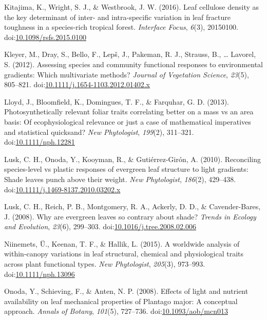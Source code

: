 \documentclass[12pt,]{article}
\theoremstyle{definition}
\theoremstyle{definition}
\theoremstyle{definition}
\theoremstyle{remark}
\begin{document}
\leavevmode\hypertarget{ref-Kitajima2016}{}%
Kitajima, K., Wright, S. J., \& Westbrook, J. W. (2016). Leaf cellulose
density as the key determinant of inter- and intra-specific variation in
leaf fracture toughness in a species-rich tropical forest.
\emph{Interface Focus}, \emph{6}(3), 20150100.
doi:\href{https://doi.org/10.1098/rsfs.2015.0100}{10.1098/rsfs.2015.0100}

\leavevmode\hypertarget{ref-Kleyer2012}{}%
Kleyer, M., Dray, S., Bello, F., Lepš, J., Pakeman, R. J., Strauss, B.,
\ldots{} Lavorel, S. (2012). Assessing species and community functional
responses to environmental gradients: Which multivariate methods?
\emph{Journal of Vegetation Science}, \emph{23}(5), 805--821.
doi:\href{https://doi.org/10.1111/j.1654-1103.2012.01402.x}{10.1111/j.1654-1103.2012.01402.x}

\leavevmode\hypertarget{ref-Lloyd2013}{}%
Lloyd, J., Bloomfield, K., Domingues, T. F., \& Farquhar, G. D. (2013).
Photosynthetically relevant foliar traits correlating better on a mass
vs an area basis: Of ecophysiological relevance or just a case of
mathematical imperatives and statistical quicksand? \emph{New
Phytologist}, \emph{199}(2), 311--321.
doi:\href{https://doi.org/10.1111/nph.12281}{10.1111/nph.12281}

\leavevmode\hypertarget{ref-Lusk2010}{}%
Lusk, C. H., Onoda, Y., Kooyman, R., \& Gutiérrez-Girón, A. (2010).
Reconciling species-level vs plastic responses of evergreen leaf
structure to light gradients: Shade leaves punch above their weight.
\emph{New Phytologist}, \emph{186}(2), 429--438.
doi:\href{https://doi.org/10.1111/j.1469-8137.2010.03202.x}{10.1111/j.1469-8137.2010.03202.x}

\leavevmode\hypertarget{ref-Lusk2008}{}%
Lusk, C. H., Reich, P. B., Montgomery, R. A., Ackerly, D. D., \&
Cavender-Bares, J. (2008). Why are evergreen leaves so contrary about
shade? \emph{Trends in Ecology and Evolution}, \emph{23}(6), 299--303.
doi:\href{https://doi.org/10.1016/j.tree.2008.02.006}{10.1016/j.tree.2008.02.006}

\leavevmode\hypertarget{ref-Niinemets2015}{}%
Niinemets, Ü., Keenan, T. F., \& Hallik, L. (2015). A worldwide analysis
of within-canopy variations in leaf structural, chemical and
physiological traits across plant functional types. \emph{New
Phytologist}, \emph{205}(3), 973--993.
doi:\href{https://doi.org/10.1111/nph.13096}{10.1111/nph.13096}

\leavevmode\hypertarget{ref-Onoda2008}{}%
Onoda, Y., Schieving, F., \& Anten, N. P. (2008). Effects of light and
nutrient availability on leaf mechanical properties of Plantago major: A
conceptual approach. \emph{Annals of Botany}, \emph{101}(5), 727--736.
doi:\href{https://doi.org/10.1093/aob/mcn013}{10.1093/aob/mcn013}
\end{document}
